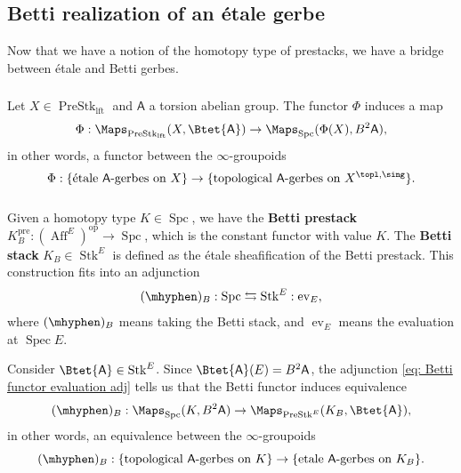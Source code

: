 \documentclass[10pt]{amsart}
\newcommand{\sssec}{\subsubsection}
\theoremstyle{remark}
\newcommand{\on}{\operatorname}
\newcommand{\PreStk}{\on{PreStk}}
\newcommand{\PreStklft}{\on{PreStk}_{\on{lft}}}
\newcommand{\Stk}{\on{Stk}}
\newcommand{\Aff}{\on{Aff}}
\newcommand{\Spc}{\on{Spc}}
\DeclareMathOperator{\op}{op}
\newcommand{\sfA}{\mathsf{A}}
\begin{document}
\subsection{Betti realization of an \'etale gerbe}\label{ssec: Betti realization}
Now that we have a notion of the homotopy type of prestacks, we have a bridge between \'etale and Betti gerbes.


\sssec{}
Let $X\in\PreStklft$ and $\sfA$ a torsion abelian group.
The functor $\Phi$ induces a map
\[\Phi: \Maps_{\PreStklft}(X, \Btet{\sfA})\rightarrow \Maps_{\Spc}(\Phi(X), B^2 \sfA),\]
in other words, a functor between the $\infty$-groupoids
\begin{equation}\label{eq: et gerbe to top gerbe}
    \Phi:\{\text{\'etale }\sfA\text{-gerbes on } X\}\rightarrow \{\text{topological }\sfA\text{-gerbes on } X^{\topl,\sing}\}.
\end{equation}

\sssec{}
Given a homotopy type $K\in\Spc$, we have the \textbf{Betti prestack} $K^{\on{pre}}_B:(\Aff^E)^{\op}\rightarrow\Spc$, which is the constant functor with value $K$. 
The \textbf{Betti stack} $K_B\in\Stk^E$ is defined as the \'etale sheafification of the Betti prestack. This construction fits into an adjunction
\begin{equation}\label{eq: Betti functor evaluation adj}
    (\mhyphen)_B: \Spc \leftrightarrows  \Stk^E: \on{ev}_{E},
\end{equation}
where $(\mhyphen)_B$ means taking the Betti stack, and $\on{ev}_{E}$ means the evaluation at $\on{Spec}E$.
\medskip

Consider $\Btet{\sfA}\in \Stk^E$.
Since $\Btet{\sfA}(E)=B^2 \sfA$, the adjunction \eqref{eq: Betti functor evaluation adj} tells us that the Betti functor induces equivalence
\[(\mhyphen)_B:\Maps_{\Spc}(K, B^2 \sfA)\rightarrow \Maps_{\PreStk^E}(K_B, \Btet{\sfA}),\]
in other words, an equivalence between the $\infty$-groupoids
\begin{equation}\label{eq: top gerbe to et gerbe}
    (\mhyphen)_B: \{\text{topological }\sfA\text{-gerbes on }K\}\rightarrow \{\text{etale }\sfA\text{-gerbes on }K_B\}.
\end{equation}
\end{document}
